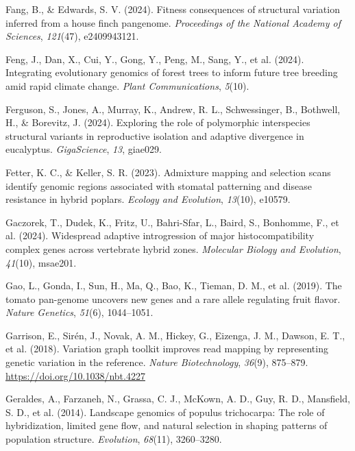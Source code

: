 \documentclass[
]{agujournal2019}
\newlength{\cslhangindent}
\newenvironment{CSLReferences}[2] %
 {\begin{list}{}{%
  \setlength{\itemindent}{0pt}
  \setlength{\leftmargin}{0pt}
  \setlength{\parsep}{0pt}
  \ifodd #1
   \setlength{\leftmargin}{\cslhangindent}
   \setlength{\itemindent}{-1\cslhangindent}
  \fi
  \setlength{\itemsep}{#2\baselineskip}}}
 {\end{list}}
\begin{document}
\begin{CSLReferences}{1}{0}
Fang, B., \& Edwards, S. V. (2024). Fitness consequences of structural
variation inferred from a house finch pangenome. \emph{Proceedings of
the National Academy of Sciences}, \emph{121}(47), e2409943121.

Feng, J., Dan, X., Cui, Y., Gong, Y., Peng, M., Sang, Y., et al. (2024).
Integrating evolutionary genomics of forest trees to inform future tree
breeding amid rapid climate change. \emph{Plant Communications},
\emph{5}(10).

Ferguson, S., Jones, A., Murray, K., Andrew, R. L., Schwessinger, B.,
Bothwell, H., \& Borevitz, J. (2024). Exploring the role of polymorphic
interspecies structural variants in reproductive isolation and adaptive
divergence in eucalyptus. \emph{GigaScience}, \emph{13}, giae029.

Fetter, K. C., \& Keller, S. R. (2023). Admixture mapping and selection
scans identify genomic regions associated with stomatal patterning and
disease resistance in hybrid poplars. \emph{Ecology and Evolution},
\emph{13}(10), e10579.

Gaczorek, T., Dudek, K., Fritz, U., Bahri-Sfar, L., Baird, S., Bonhomme,
F., et al. (2024). Widespread adaptive introgression of major
histocompatibility complex genes across vertebrate hybrid zones.
\emph{Molecular Biology and Evolution}, \emph{41}(10), msae201.

Gao, L., Gonda, I., Sun, H., Ma, Q., Bao, K., Tieman, D. M., et al.
(2019). The tomato pan-genome uncovers new genes and a rare allele
regulating fruit flavor. \emph{Nature Genetics}, \emph{51}(6),
1044--1051.

Garrison, E., Sirén, J., Novak, A. M., Hickey, G., Eizenga, J. M.,
Dawson, E. T., et al. (2018). Variation graph toolkit improves read
mapping by representing genetic variation in the reference. \emph{Nature
Biotechnology}, \emph{36}(9), 875--879.
\url{https://doi.org/10.1038/nbt.4227}

Geraldes, A., Farzaneh, N., Grassa, C. J., McKown, A. D., Guy, R. D.,
Mansfield, S. D., et al. (2014). Landscape genomics of populus
trichocarpa: The role of hybridization, limited gene flow, and natural
selection in shaping patterns of population structure. \emph{Evolution},
\emph{68}(11), 3260--3280.


\end{CSLReferences}
\end{document}
